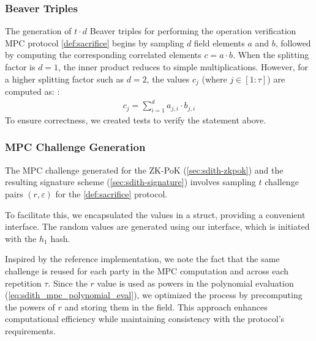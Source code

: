 \documentclass[11pt]{report}
\theoremstyle{definition}
\theoremstyle{plain}
\newcommand{\todo}[1]{{\color[rgb]{.5,0,0}\textbf{$\blacktriangleright$#1$\blacktriangleleft$}}}
\begin{document}

\subsubsection{Beaver Triples}
The generation of $t \cdot d$ Beaver triples for performing the operation verification MPC protocol \autoref{def:sacrifice} begins by sampling $d$ field elements $a$ and $b$, followed by computing the corresponding correlated elements $c = a \cdot b$. When the splitting factor is $d=1$, the inner product reduces to simple multiplications. However, for a higher splitting factor such as $d=2$, the values $c_j$ (where $j \in [1:\tau]$) are computed as:
:
\begin{align}
  c_j = \sum_{i=1}^{d} a_{ j,i } \cdot b_{j,i}
\end{align}
To ensure correctness, we created tests to verify the statement above.

\subsubsection{MPC Challenge Generation}

The MPC challenge generated for the ZK-PoK (\autoref{sec:sdith-zkpok}) and the resulting signature scheme (\autoref{sec:sdith-signature}) involves sampling $t$ challenge pairs $(r, \varepsilon)$ for the \autoref{def:sacrifice} protocol.

To facilitate this, we encapsulated the values in a  struct, providing a convenient interface. The random values are generated using our  interface, which is initiated with the $h_1$ hash.

Inspired by the reference implementation, we note the fact that the same challenge is reused for each party in the MPC computation and across each repetition $\tau$. Since the $r$ value is used as powers in the polynomial evaluation (\autoref{eq:sdith_mpc_polynomial_eval}), we optimized the process by precomputing the powers of $r$ and storing them in the  field. This approach enhances computational efficiency while maintaining consistency with the protocol's requirements.
\end{document}
